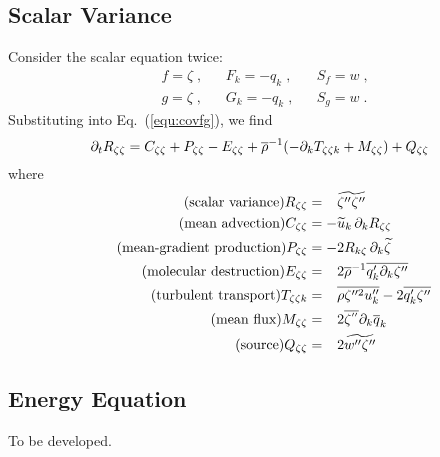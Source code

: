 \subsection{Scalar Variance}

Consider the scalar equation twice:
\begin{align}
  &f = \zeta\;, && F_k=-q_{k}\;, && S_f = w\;,\\
  &g = \zeta\;, && G_k=-q_{k}\;, && S_g = w\;.
\end{align}
Substituting into Eq.~(\ref{equ:covfg}), we find
\begin{equation}\label{equ:Rss}
  \pt{R_{\zeta \zeta}}{t}= C_{\zeta\zeta}+P_{\zeta\zeta} - E_{\zeta\zeta}
  +\avr{\rho}^{-1} (- \pt{T_{\zeta\zeta k}}{k} +M_{\zeta\zeta} ) + Q_{\zeta\zeta}
\end{equation}
where
\begin{align}
  \tag{scalar variance}
    R_{\zeta \zeta} &=\phantom{-} \avf{\zeta''\zeta''}\\
  \tag{mean advection}
    C_{\zeta \zeta} &=-\avf{u}_k\,\pt{R_{\zeta \zeta}}{k}\\
  \tag{mean-gradient production}
    P_{\zeta \zeta} &=-2 R_{k \zeta}\,\pt{\avf{\zeta}}{k}\\
  \tag{molecular destruction}
    E_{\zeta\zeta} &=\phantom{-} 2 \avr{\rho}^{-1}\avr{q_k' \pt{\zeta''}{k}}\\
  \tag{turbulent transport}
    T_{\zeta\zeta k}&=\phantom{-} \avr{\rho \zeta''^{2} u''_k } -2 \avr{q_k'\zeta''}\\
  \tag{mean flux}
    M_{\zeta\zeta}  &=\phantom{-} 2 \avr{\zeta^{''}} \pt{\avr{q}_k}{k}\\
  \tag{source}
    Q_{\zeta\zeta}  &=\phantom{-} 2 \avf{w''\zeta''}
\end{align}

\subsection{Energy Equation}

To be developed.
